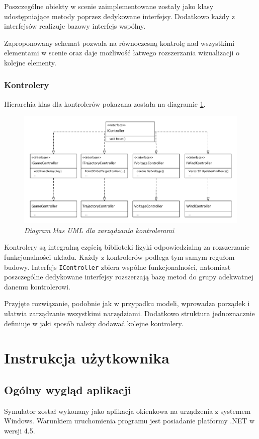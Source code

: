\documentclass[12pt, twoside, openany]{report}
\theoremstyle{definition}
\begin{document}
Poszczególne obiekty w scenie zaimplementowane zostały jako klasy udostępniające metody poprzez dedykowane interfejsy. Dodatkowo każdy z interfejsów realizuje bazowy interfejs wspólny. 

Zaproponowany schemat pozwala na równoczesną kontrolę nad wszystkimi elementami w scenie oraz daje możliwość łatwego rozszerzania wizualizacji o kolejne elementy.

\subsection{Kontrolery}
Hierarchia klas dla kontrolerów pokazana została na diagramie \ref{IController}.  

\begin{figure}[H]
	\centering
		\includegraphics[width = 400pt]{IController} 
		\caption{\textit{Diagram klas UML dla zarządzania kontrolerami}}
		\label{IController}
\end{figure}

Kontrolery są integralną częścią biblioteki fizyki odpowiedzialną za rozszerzanie funkcjonalności układu. Każdy z kontrolerów podlega tym samym regułom budowy. Interfejs \texttt{IController} zbiera wspólne funkcjonalności, natomiast poszczególne dedykowane interfejsy rozszerzają bazę metod do grupy adekwatnej danemu kontrolerowi. 

Przyjęte rozwiązanie, podobnie jak w przypadku modeli, wprowadza porządek i ułatwia zarządzanie wszystkimi narzędziami. Dodatkowo struktura jednoznacznie definiuje w jaki sposób należy dodawać kolejne kontrolery.

\chapter{Instrukcja użytkownika}
\section{Ogólny wygląd aplikacji}
Symulator został wykonany jako aplikacja okienkowa na urządzenia z systemem Windows. Warunkiem uruchomienia programu jest posiadanie platformy .NET w wersji 4.5. 
\end{document}
